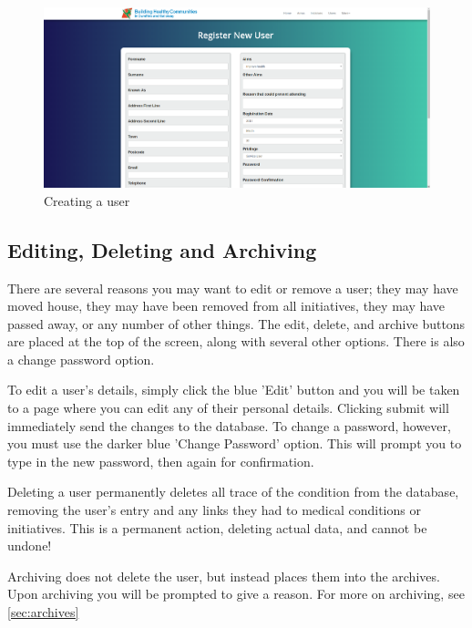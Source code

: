 \documentclass{bhcguides}
\begin{document}
\begin{figure}[h!]
 \centerline{\includegraphics[width=\textwidth, height=\textheight, keepaspectratio]{createuser.png}}
 \caption{Creating a user}
 \label{fig:createUser}
\end{figure}

\subsection{Editing, Deleting and Archiving}
\label{ssec:usereditdelete}

There are several reasons you may want to edit or remove a user; they may have moved house, they may have been removed from all initiatives, they may have passed away, or any number of other things. The edit, delete, and archive buttons are placed at the top of the screen, along with several other options. There is also a change password option.

To edit a user's details, simply click the blue 'Edit' button and you will be taken to a page where you can edit any of their personal details. Clicking submit will immediately send the changes to the database. To change a password, however, you must use the darker blue 'Change Password' option. This will prompt you to type in the new password, then again for confirmation.

Deleting a user permanently deletes all trace of the condition from the database, removing the user's entry and any links they had to medical conditions or initiatives. This is a permanent action, deleting actual data, and cannot be undone!

Archiving does not delete the user, but instead places them into the archives. Upon archiving you will be prompted to give a reason. For more on archiving, see \autoref{sec:archives}
\end{document}
